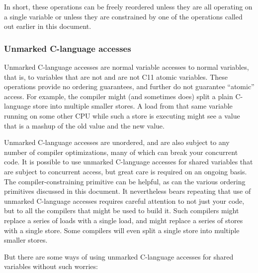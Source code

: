 In short, these operations can be freely reordered unless they are all
operating on a single variable or unless they are constrained by one of
the operations called out earlier in this document.


\subsubsection{Unmarked C-language accesses}

Unmarked C-language accesses are normal variable accesses to normal
variables, that is, to variables that are not  and are not
C11 atomic variables.
These operations provide no ordering guarantees, and further do not
guarantee ``atomic'' access.
For example, the compiler might (and sometimes does) split a plain
C-language store into multiple smaller stores.
A load from that same variable running on some other CPU while such
a store is executing might see a value that is a mashup of the old
value and the new value.

Unmarked C-language accesses are unordered, and are also subject to
any number of compiler optimizations, many of which can break your
concurrent code.
It is possible to use unmarked C-language accesses for shared variables
that are subject to concurrent access, but great care is required on
an ongoing basis.
The compiler-constraining  primitive can be helpful, as
can the various ordering primitives discussed in this document.
It nevertheless bears repeating that use of unmarked C-language accesses
requires careful attention to not just your code, but to all the
compilers that might be used to build it.
Such compilers might replace a series of loads with a single load,
and might replace a series of stores with a single store.
Some compilers will even split a single store into multiple smaller stores.

But there are some ways of using unmarked C-language accesses for shared
variables without such worries:

